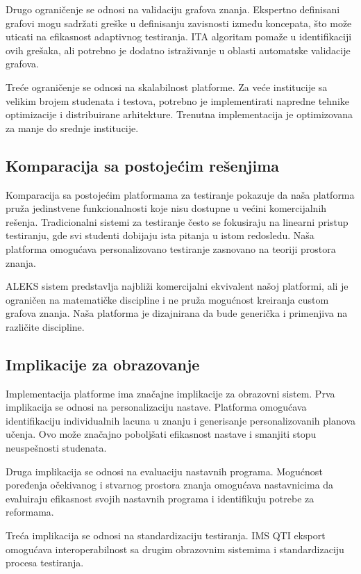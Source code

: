 \documentclass[conference]{IEEEtran}
\begin{document}
Drugo ograničenje se odnosi na validaciju grafova znanja. Ekspertno definisani grafovi mogu sadržati greške u definisanju zavisnosti između koncepata, što može uticati na efikasnost adaptivnog testiranja. ITA algoritam pomaže u identifikaciji ovih grešaka, ali potrebno je dodatno istraživanje u oblasti automatske validacije grafova.

Treće ograničenje se odnosi na skalabilnost platforme. Za veće institucije sa velikim brojem studenata i testova, potrebno je implementirati napredne tehnike optimizacije i distribuirane arhitekture. Trenutna implementacija je optimizovana za manje do srednje institucije.

\subsection{Komparacija sa postojećim rešenjima}

Komparacija sa postojećim platformama za testiranje pokazuje da naša platforma pruža jedinstvene funkcionalnosti koje nisu dostupne u većini komercijalnih rešenja. Tradicionalni sistemi za testiranje često se fokusiraju na linearni pristup testiranju, gde svi studenti dobijaju ista pitanja u istom redosledu. Naša platforma omogućava personalizovano testiranje zasnovano na teoriji prostora znanja.

ALEKS sistem predstavlja najbliži komercijalni ekvivalent našoj platformi, ali je ograničen na matematičke discipline i ne pruža mogućnost kreiranja custom grafova znanja. Naša platforma je dizajnirana da bude generička i primenjiva na različite discipline.

\subsection{Implikacije za obrazovanje}

Implementacija platforme ima značajne implikacije za obrazovni sistem. Prva implikacija se odnosi na personalizaciju nastave. Platforma omogućava identifikaciju individualnih lacuna u znanju i generisanje personalizovanih planova učenja. Ovo može značajno poboljšati efikasnost nastave i smanjiti stopu neuspešnosti studenata.

Druga implikacija se odnosi na evaluaciju nastavnih programa. Mogućnost poređenja očekivanog i stvarnog prostora znanja omogućava nastavnicima da evaluiraju efikasnost svojih nastavnih programa i identifikuju potrebe za reformama.

Treća implikacija se odnosi na standardizaciju testiranja. IMS QTI eksport omogućava interoperabilnost sa drugim obrazovnim sistemima i standardizaciju procesa testiranja.
\end{document}
